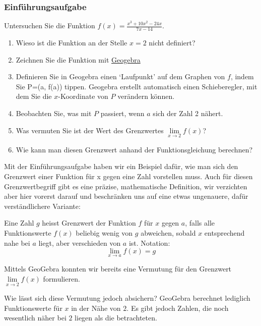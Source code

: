 \subsubsection*{Einführungsaufgabe}
Untersuchen Sie die Funktion $f(x)=\frac{x^3+10x^2-24x}{7x-14}$.
\begin{enumerate}
    \item Wieso ist die Funktion an der Stelle $x=2$ nicht definiert?
    \item Zeichnen Sie die Funktion mit \href{https://www.geogebra.org/calculator}{Geogebra}
    \item Definieren Sie in Geogebra einen `Laufpunkt' auf dem Graphen von $f$, indem Sie P=(a, f(a)) tippen. Geogebra erstellt automatisch einen Schieberegler, mit dem Sie die $x$-Koordinate von $P$ verändern können.
    \item  Beobachten Sie, was mit $P$ passiert, wenn $a$ sich der Zahl 2 nähert.
    \item  Was vermuten Sie ist der Wert des Grenzwertes $\lim\limits_{x\to 2} f(x)$?
    \item  Wie kann man diesen Grenzwert anhand der Funktionsgleichung berechnen?
\end{enumerate}
\clearpage
Mit der Einführungsaufgabe haben wir ein Beispiel dafür, wie man sich den Grenzwert einer Funktion für x gegen eine Zahl vorstellen muss. Auch für diesen Grenzwertbegriff gibt es eine präzise, mathematische Definition, wir verzichten aber hier vorerst darauf und beschränken uns auf eine etwas ungenauere, dafür verständlichere Variante:

\begin{deff}{}{}
    Eine Zahl $g$ heisst Grenzwert der Funktion $f$ für $x$ gegen $a$, falls alle Funktionswerte $f\left( x\right)$ beliebig wenig von $g$ abweichen, sobald $x$ entsprechend nahe bei $a$ liegt, aber verschieden von $a$ ist. Notation:
    \begin{equation*}
        \lim_{x \to a} f(x) = g
    \end{equation*}
\end{deff}
Mittels GeoGebra konnten wir bereits eine Vermutung für den Grenzwert $\lim\limits_{x\to 2} f(x)$ formulieren.

Wie lässt sich diese Vermutung jedoch absichern? GeoGebra berechnet lediglich Funktionswerte für $x$ in der Nähe von $2$. Es gibt jedoch Zahlen, die noch wesentlich näher bei $2$ liegen als die betrachteten.

